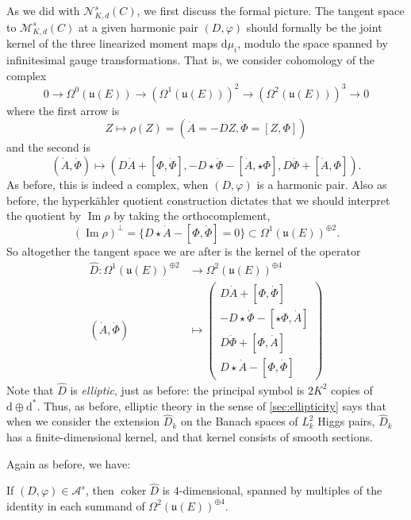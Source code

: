 \documentclass[12pt,letterpaper,reqno]{article}
\numberwithin{equation}{section}
\newcommand{\fu}{{\mathfrak u}}
\newcommand{\cM}{\ensuremath{\mathcal M}}
\newcommand{\cN}{\ensuremath{\mathcal N}}
\newcommand{\cA}{\ensuremath{\mathcal A}}
\newcommand{\hk}{hyperk\"ahler\xspace}
\newcommand{\de}{\mathrm{d}}
\newcommand{\ti}[1]{\textit{#1}}
\DeclareMathOperator{\im}{Im}
\DeclareMathOperator{\coker}{coker}
\begin{document}
As we did with $\cN^s_{K,d}(C)$, we 
first discuss the formal picture. The tangent space to
$\cM_{K,d}^s(C)$ at a given harmonic pair $(D,\varphi)$
should formally be the joint kernel of the
three linearized moment maps $\de \mu_i$, modulo the space spanned
by infinitesimal gauge transformations.
That is, we consider cohomology of the complex
\begin{equation}
  0 \to \Omega^0(\fu(E)) \to (\Omega^{1}(\fu(E)))^2 \to (\Omega^2(\fu(E)))^3 \to 0
\end{equation}
where the first arrow is
\begin{equation}
 Z \mapsto \rho(Z) = (\dot A = -D Z, \dot \Phi = [Z,\Phi])
\end{equation}
and the second is
\begin{equation}
(\dot A, \dot \Phi) \mapsto (D \dot{A} + [\Phi,\dot\Phi], -D \star \dot\Phi - [\dot A, \star\Phi], D \dot\Phi + [\dot A, \Phi]).
\end{equation}
As before, this is indeed a complex, when $(D,\varphi)$ is a harmonic 
pair. Also as before, the \hk quotient construction dictates that
we should interpret the quotient by $\im \rho$
by taking the orthocomplement,
\begin{equation}
  (\im \rho)^\perp = \{D \star \dot{A} - [\Phi, \dot\Phi] = 0\} \subset \Omega^1(\fu(E))^{\oplus 2}.
\end{equation}
So altogether the tangent space we are after is the kernel of
the operator
\begin{align}
\hat{D}: \Omega^1(\fu(E))^{\oplus 2} &\to \Omega^2(\fu(E))^{\oplus 4} \\
(\dot A, \dot \Phi) &\mapsto \begin{pmatrix} D \dot{A} + [\Phi,\dot\Phi] \\ -D \star \dot\Phi - [\star \Phi, \dot A] \\ D \dot\Phi + [\Phi, \dot A] \\ D \star \dot{A} - [\Phi, \dot \Phi] \end{pmatrix}
\end{align}
Note that $\hat{D}$ is \ti{elliptic}, just as before:
the principal symbol is $2K^2$ copies of $\de \oplus \de^*$.
Thus, as before, elliptic theory in the sense of \autoref{sec:ellipticity}
says that when we 
consider the extension $\hat{D}_k$ on the Banach spaces of $L^2_k$ 
Higgs pairs, $\hat{D}_k$ has a finite-dimensional
kernel, and that kernel consists of smooth sections.

Again as before, we have:
\begin{lem} If $(D,\varphi) \in \cA^s$, then $\coker \hat{D}$ is $4$-dimensional,
spanned by multiples of the identity in each summand
of $\Omega^2(\fu(E))^{\oplus 4}$.
\end{lem}
\end{document}
